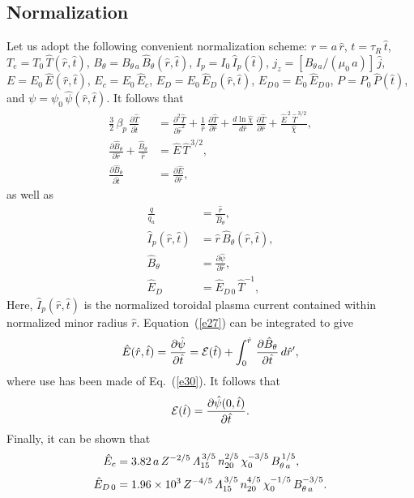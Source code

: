 \documentclass{iopjournal}
\begin{document}
\subsection{Normalization}
 Let us adopt the following convenient normalization scheme: $r=a\,\hat{r}$, $t=\tau_R\,\hat{t}$, $T_e=T_0\,\hat{T}(\hat{r},\hat{t})$, $B_\theta=B_{\theta\,a}\,\hat{B}_\theta(\hat{r},\hat{t})$,
 $I_p=I_0\,\hat{I}_p(\hat{t})$, $j_z=[B_{\theta\,a}/(\mu_0\,a)]\,\hat{j}$, $E=E_0\,\hat{E}(\hat{r},\hat{t})$, $E_c= E_0\,\hat{E}_c$, $E_D= E_0\,\hat{E}_D(\hat{r},\hat{t})$, $E_{D\,0}=E_0\,\hat{E}_{D\,0}$, $P= P_0\,\hat{P}(\hat{t})$,  and
 $\psi=\psi_0\,\hat{\psi}(\hat{r},\hat{t})$. It follows that 
 \begin{align}\label{e25}
\frac{3}{2}\,\beta_p\,\frac{\partial \hat{T}}{\partial\hat{t}}&=
 \frac{\partial^2\hat{T}}{\partial \hat{r}^2} 
 +\frac{1}{\hat{r}}\,\frac{\partial\hat{T}}{\partial\hat{r}} + \frac{d\ln\hat{\chi}}{d\hat{r}}\,\frac{\partial\hat{T}}{\partial\hat{r}}
 + \frac{\hat{E}^{\,2}\,\hat{T}^{\,3/2}}{\hat{\chi}},\\[0.5ex]
\frac{\partial\hat{B}_\theta}{\partial \hat{r}} + \frac{\hat{B}_\theta}{\hat{r}}&= \hat{E}\,\hat{T}^{\,3/2},\\[0.5ex]
\frac{\partial\hat{B}_\theta}{\partial\hat{t}}&= \frac{\partial\hat{E}}{\partial\hat{r}},\label{e27}
 \end{align}
 as well as
 \begin{align}
 \frac{q}{q_a}&= \frac{\hat{r}}{\hat{B}_\theta},\label{e28}\\[0.5ex]
 \hat{I}_p(\hat{r},\hat{t})&= \hat{r}\,\hat{B}_\theta(\hat{r},\hat{t}),\label{e29}\\[0.5ex]
 \hat{B}_\theta &=\frac{\partial\hat{\psi}}{\partial\hat{r}},\label{e30}\\[0.5ex]
 \hat{E}_D&= \hat{E}_{D\,0}\,\hat{T}^{-1},
 \end{align}
 Here, $\hat{I}_p(\hat{r},\hat{t})$ is the normalized toroidal plasma current contained within normalized minor radius $\hat{r}$. 
 Equation~(\ref{e27}) can be integrated to give
 \begin{equation}\label{e31}
 \hat{E}(\hat{r},\hat{t})= \frac{\partial\hat{\psi}}{\partial \hat{t}}={\cal E}(\hat{t})+\int_0^{\hat{r}}\,\frac{\partial\hat{B}_\theta}{\partial\hat{t}}\,d\hat{r}',
 \end{equation}
 where use has been made of Eq.~(\ref{e30}). It follows that 
 \begin{equation}
 {\cal E}(\hat{t}) = \frac{\partial\hat{\psi}(0,\hat{t})}{\partial\hat{t}}.
 \end{equation}
 Finally, it can be shown that
 \begin{align}
 \hat{E}_c&= 3.82\,a\,Z^{-2/5}\,{\mit\Lambda}_{15}^{\,3/5}\,n_{20}^{2/5}\,\chi_0^{-3/5}\,B_{\theta\,a}^{\,1/5},\\[0.5ex]
 \hat{E}_{D\,0} &= 1.96\times 10^3\,Z^{-4/5}\,{\mit\Lambda}_{15}^{\,3/5}\,n_{20}^{4/5}\,\chi_0^{-1/5}\,B_{\theta\,a}^{-3/5}.
 \end{align}
 
\end{document}
